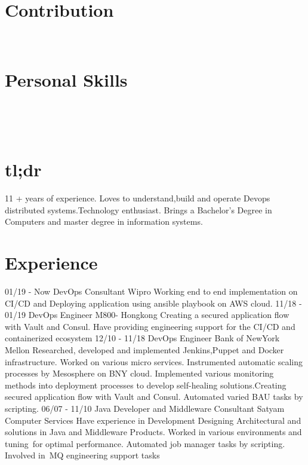 \documentclass[]{friggeri-cv}
\begin{document}
\begin{aside}
  \section{Contribution}
    ~
  \section{Personal Skills}
    ~
\end{aside}
~

\section{tl;dr}
\begin{entrylist}
  \entry
    {}
    {}
   {}
  {11 + years of experience. Loves to understand,build and operate Devops distributed systems.Technology enthusiast. Brings a Bachelor’s Degree in Computers and master degree in information systems. }
\end{entrylist} 

\section{Experience}
\begin{entrylist}
\entry
  {01/19 - Now}
  {DevOps Consultant}
  {Wipro}
  {Working end to end implementation on CI/CD and Deploying application using ansible playbook on AWS cloud.}
  \entry
  {11/18 - 01/19}
  {DevOps Engineer}
  {M800- Hongkong}
  {Creating a secured application flow with Vault and Consul. Have providing engineering support for the CI/CD and containerized ecosystem}
  \entry
    {12/10 - 11/18}
    {DevOps Engineer}
    {Bank of NewYork Mellon}
    {Researched, developed and implemented Jenkins,Puppet and Docker infrastructure. Worked on various micro services. Instrumented automatic scaling processes by Mesosphere on BNY cloud. Implemented various monitoring methods into deployment processes to develop self-healing solutions.Creating secured application flow with Vault and Consul. Automated varied BAU tasks by scripting. }
  \entry
    {06/07 - 11/10}
    {Java Developer and Middleware Consultant}
    {Satyam Computer Services}
    {Have experience in Development Designing Architectural and solutions in Java and Middleware Products. Worked in various environments and tuning for optimal performance. Automated job manager tasks by scripting. Involved in MQ engineering support tasks}
   \end{entrylist}
\end{document}
